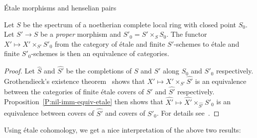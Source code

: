 \documentclass[a4paper,twoside,11pt]{amsart}[2009/07/02] %
\newcommand{\pref}[1]{\eqref{#1}}
\newcommand{\etale}{\'{e}tale}
\newcommand{\Etale}{\'{E}tale}
\begin{document}
\begin{section}{\Etale{} morphisms and henselian pairs}
\begin{theorem}
\label{T:1-henselian-for-proper-over-complete}
Let $S$ be the spectrum of a noetherian complete local ring with closed point
$S_0$. Let $S'\to S$ be a \emph{proper} morphism and $S'_0=S'\times_S S_0$. The
functor $X'\mapsto X'\times_{S'} S'_0$ from the category of \etale{} and
finite $S'$-schemes to \etale{} and finite $S'_0$-schemes is then an
equivalence of categories.
\end{theorem}
\begin{proof}
Let $\widehat{S}$ and $\widehat{S'}$ be the completions of $S$ and $S'$ along
$S_0$ and $S'_0$ respectively. Grothendieck's existence
theorem~\cite[Thm.~5.1.4]{egaIII} shows that $X'\mapsto X'\times_{S'}
\widehat{S'}$ is an equivalence between the categories of finite \etale{}
covers of $S'$ and $\widehat{S'}$ respectively.
Proposition~\pref{P:nil-imm-equiv-etale} then shows that $\widehat{X'}\mapsto
\widehat{X'}\times_{\widehat{S'}} S'_0$ is an equivalence between covers of
$\widehat{S'}$ and covers of $S'_0$.
%
For details see~\cite[Thm.~18.3.4]{egaIV}.
\end{proof}

Using \etale{} cohomology, we get a nice interpretation of the above two
results:


\end{section}
\end{document}
